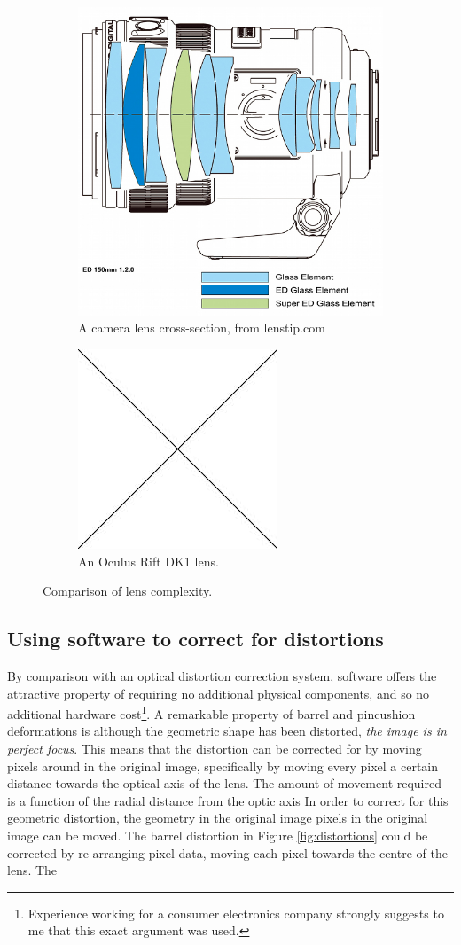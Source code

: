 \documentclass[MSc,paper=a4,pagesize=auto]{icldt}
\begin{document}
\begin{figure}[htbp!]
\centering
\begin{subfigure}{0.5\textwidth}
    \centering
    \includegraphics[width=0.4\linewidth]{resources/camera_lens}
    \caption{A camera lens cross-section, from lenstip.com}
	\label{fig:camera_lens}
\end{subfigure}%
\centering
\begin{subfigure}{0.5\textwidth}
    \centering
    \includegraphics[width=0.4\linewidth]{resources/placeholder}
    \caption{An Oculus Rift DK1 lens.}
	\label{fig:rift_lens}
\end{subfigure}    
    \caption{Comparison of lens complexity.}
    \label{fig:lens_comparison}
\end{figure}

\subsection{Using software to correct for distortions}
By comparison with an optical distortion correction system, software offers the attractive property of requiring no additional physical components, and so no additional hardware cost\footnote{Experience working for a consumer electronics company strongly suggests to me that this exact argument was used.}. A remarkable property of barrel and pincushion deformations is although the geometric shape has been distorted, \textit{the image is in perfect focus}. This means that the distortion can be corrected for by moving pixels around in the original image, specifically by moving every pixel a certain distance towards the optical axis of the lens. The amount of movement required is a function of the radial distance from the optic axis \cite{Brunelli2009} In order to correct for this geometric distortion, the geometry in the original image pixels in the original image can be moved. The barrel distortion in Figure \ref{fig:distortions} could be corrected by re-arranging pixel data, moving each pixel towards the centre of the lens. The 
\end{document}
